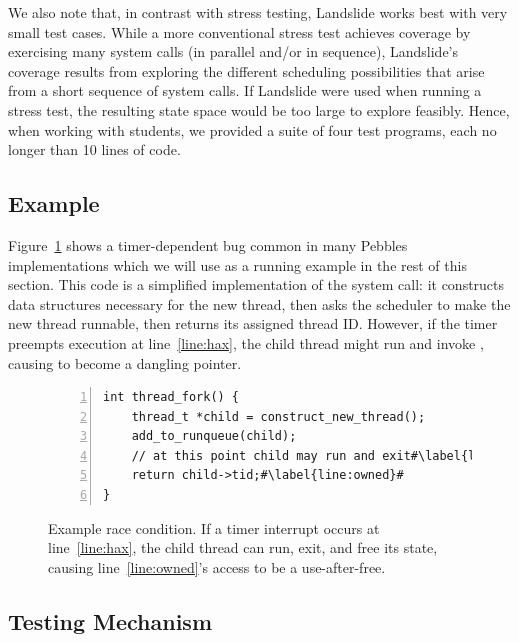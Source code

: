 We also note that, in contrast with stress testing, Landslide works best with very small test cases. While a more conventional stress test achieves coverage by exercising many system calls (in parallel and/or in sequence), Landslide's coverage results from exploring the different scheduling possibilities that arise from a short sequence of system calls.
If Landslide were used when running a stress test, the resulting state space would be too large to explore feasibly.
Hence, when working with students, we provided a suite of four test programs, each no longer than 10 lines of code.

\subsection{Example}

Figure~\ref{fig:threadfork} shows a timer-dependent bug common in many Pebbles implementations which we will use as a running example in the rest of this section. This code is a simplified implementation of the  system call: it constructs data structures necessary for the new thread, then asks the scheduler to make the new thread runnable, then returns its assigned thread ID. However, if the timer preempts execution at line~\ref{line:hax}, the child thread might run and invoke , causing  to become a dangling pointer.

\begin{figure}[t]
\small
\begin{lstlisting}[numbers=left]
int thread_fork() {
	thread_t *child = construct_new_thread();
	add_to_runqueue(child);
	// at this point child may run and exit#\label{line:hax}#
	return child->tid;#\label{line:owned}#
}
\end{lstlisting}
\caption{Example race condition. If a timer interrupt occurs at line~\ref{line:hax}, the child thread can run, exit, and free its state, causing line~\ref{line:owned}'s access to be a use-after-free.}
\label{fig:threadfork}
\end{figure}

\subsection{Testing Mechanism}

